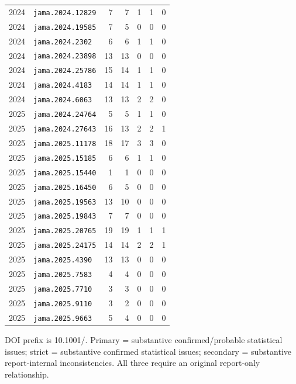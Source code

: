 \begin{longtable}{llrrrrr}
2024 & \texttt{jama.2024.12829} & 7 & 7 & 1 & 1 & 0 \\
2024 & \texttt{jama.2024.19585} & 7 & 5 & 0 & 0 & 0 \\
2024 & \texttt{jama.2024.2302} & 6 & 6 & 1 & 1 & 0 \\
2024 & \texttt{jama.2024.23898} & 13 & 13 & 0 & 0 & 0 \\
2024 & \texttt{jama.2024.25786} & 15 & 14 & 1 & 1 & 0 \\
2024 & \texttt{jama.2024.4183} & 14 & 14 & 1 & 1 & 0 \\
2024 & \texttt{jama.2024.6063} & 13 & 13 & 2 & 2 & 0 \\
2025 & \texttt{jama.2024.24764} & 5 & 5 & 1 & 1 & 0 \\
2025 & \texttt{jama.2024.27643} & 16 & 13 & 2 & 2 & 1 \\
2025 & \texttt{jama.2025.11178} & 18 & 17 & 3 & 3 & 0 \\
2025 & \texttt{jama.2025.15185} & 6 & 6 & 1 & 1 & 0 \\
2025 & \texttt{jama.2025.15440} & 1 & 1 & 0 & 0 & 0 \\
2025 & \texttt{jama.2025.16450} & 6 & 5 & 0 & 0 & 0 \\
2025 & \texttt{jama.2025.19563} & 13 & 10 & 0 & 0 & 0 \\
2025 & \texttt{jama.2025.19843} & 7 & 7 & 0 & 0 & 0 \\
2025 & \texttt{jama.2025.20765} & 19 & 19 & 1 & 1 & 1 \\
2025 & \texttt{jama.2025.24175} & 14 & 14 & 2 & 2 & 1 \\
2025 & \texttt{jama.2025.4390} & 13 & 13 & 0 & 0 & 0 \\
2025 & \texttt{jama.2025.7583} & 4 & 4 & 0 & 0 & 0 \\
2025 & \texttt{jama.2025.7710} & 3 & 3 & 0 & 0 & 0 \\
2025 & \texttt{jama.2025.9110} & 3 & 2 & 0 & 0 & 0 \\
2025 & \texttt{jama.2025.9663} & 5 & 4 & 0 & 0 & 0 \\
\end{longtable}
\normalsize
\noindent\footnotesize DOI prefix is 10.1001/. Primary = substantive confirmed/probable statistical issues; strict = substantive confirmed statistical issues; secondary = substantive report-internal inconsistencies. All three require an original report-only relationship.\normalsize
